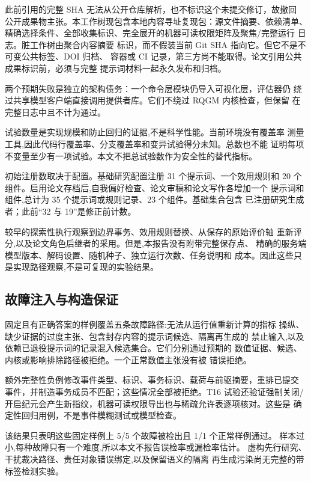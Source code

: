 此前引用的完整 SHA 无法从公开仓库解析，也不标识这个未提交修订，故撤回
公开成果物主张。本工作树现包含本地内容寻址复现包：源文件摘要、依赖清单、
精确选择条件、全部收集标识、完全展开的机器可读权限矩阵及聚焦/完整运行
日志。脏工作树由聚合内容摘要
标识，而不假装当前 Git SHA 指向它。但它不是不可变公共标签、DOI 归档、
容器或 CI 记录，第三方尚不能取得。论文引用公共成果标识前，必须与完整
提示词材料一起永久发布和归档。

两个预期失败是独立的架构债务：一个命令层模块仍导入可视化层，评估器仍
绕过共享模型客户端直接调用提供者库。它们不绕过 RQGM 内核检查，但保留
在完整日志中且不计为通过。

试验数量是实现规模和防止回归的证据,不是科学性能。当前环境没有覆盖率
测量工具,因此代码行覆盖率、分支覆盖率和变异试验得分未知。总数也不能
证明每项不变量至少有一项试验。本文不把总试验数作为安全性的替代指标。

初始注册数取决于配置。基础研究配置注册 31 个提示词、一个效用规则和
20 个组件。启用论文存档后,自我偏好检查、论文审稿和论文写作各增加一个
提示词和组件,总计为 35 个提示词或规则记录、23 个组件。基础集合包含
已注册研究生成者；此前“32 与 19”是修正前计数。

较早的探索性执行观察到边界事务、效用规则替换、从保存的原始评价轴
重新评分,以及论文角色后继者的采用。但是,本报告没有附带完整保存点、
精确的服务端模型版本、解码设置、随机种子、独立运行次数、任务说明和
成本。因此这些只是实现路径观察,不是可复现的实验结果。

\subsection{故障注入与构造保证}\label{sec:eval:repro}

固定且有正确答案的样例覆盖五条故障路径:无法从运行值重新计算的指标
操纵、缺少证据的过度主张、包含封存内容的提示词候选、隔离再生成的
禁止输入,以及依赖已退役提示词的记录混入候选集合。它们分别通过预期的
数值证据、候选、内核或影响排除路径被拒绝。一个正常数值主张没有被
错误拒绝。

额外完整性负例修改事件类型、标识、事务标识、载荷与前驱摘要，重排已提交
事件，并制造事务成员不匹配；这些情况全部被拒绝。T16 试验还验证强制关闭/
开启纪元会产生新指纹，机器可读权限导出也与稀疏允许表逐项核对。这些是
确定性回归用例，不是事件模糊测试或模型检查。

该结果只表明这些固定样例上 5/5 个故障被检出且 1/1 个正常样例通过。
样本过小,每种故障只有一个难度,所以本文不报告误检率或漏检率估计。
虚构先行研究、干扰裁决路径、责任对象错误绑定,以及保留语义的隔离
再生成污染尚无完整的带标签检测实验。

